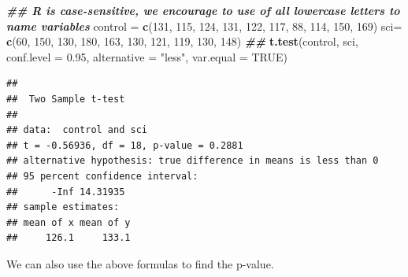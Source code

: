 \documentclass[
]{book}
\newenvironment{Shaded}{\begin{snugshade}}{\end{snugshade}}
\newcommand{\AttributeTok}[1]{\textcolor[rgb]{0.13,0.29,0.53}{#1}}
\newcommand{\ConstantTok}[1]{\textcolor[rgb]{0.56,0.35,0.01}{#1}}
\newcommand{\DecValTok}[1]{\textcolor[rgb]{0.00,0.00,0.81}{#1}}
\newcommand{\DocumentationTok}[1]{\textcolor[rgb]{0.56,0.35,0.01}{\textbf{\textit{#1}}}}
\newcommand{\FloatTok}[1]{\textcolor[rgb]{0.00,0.00,0.81}{#1}}
\newcommand{\FunctionTok}[1]{\textcolor[rgb]{0.13,0.29,0.53}{\textbf{#1}}}
\newcommand{\NormalTok}[1]{#1}
\newcommand{\OtherTok}[1]{\textcolor[rgb]{0.56,0.35,0.01}{#1}}
\newcommand{\StringTok}[1]{\textcolor[rgb]{0.31,0.60,0.02}{#1}}
\begin{document}
\begin{Shaded}
\begin{Highlighting}[]
\DocumentationTok{\#\# R is case{-}sensitive, we encourage to use of all lowercase letters to name variables}
\NormalTok{control }\OtherTok{=} \FunctionTok{c}\NormalTok{(}\DecValTok{131}\NormalTok{, }\DecValTok{115}\NormalTok{, }\DecValTok{124}\NormalTok{, }\DecValTok{131}\NormalTok{, }\DecValTok{122}\NormalTok{, }\DecValTok{117}\NormalTok{, }\DecValTok{88}\NormalTok{, }\DecValTok{114}\NormalTok{, }\DecValTok{150}\NormalTok{, }\DecValTok{169}\NormalTok{)}
\NormalTok{sci}\OtherTok{=} \FunctionTok{c}\NormalTok{(}\DecValTok{60}\NormalTok{, }\DecValTok{150}\NormalTok{, }\DecValTok{130}\NormalTok{, }\DecValTok{180}\NormalTok{, }\DecValTok{163}\NormalTok{, }\DecValTok{130}\NormalTok{, }\DecValTok{121}\NormalTok{, }\DecValTok{119}\NormalTok{, }\DecValTok{130}\NormalTok{, }\DecValTok{148}\NormalTok{)}
\DocumentationTok{\#\#}
\FunctionTok{t.test}\NormalTok{(control, sci, }
       \AttributeTok{conf.level =} \FloatTok{0.95}\NormalTok{, }
       \AttributeTok{alternative =} \StringTok{"less"}\NormalTok{, }
       \AttributeTok{var.equal =} \ConstantTok{TRUE}\NormalTok{)}
\end{Highlighting}
\end{Shaded}

\begin{verbatim}
## 
##  Two Sample t-test
## 
## data:  control and sci
## t = -0.56936, df = 18, p-value = 0.2881
## alternative hypothesis: true difference in means is less than 0
## 95 percent confidence interval:
##      -Inf 14.31935
## sample estimates:
## mean of x mean of y 
##     126.1     133.1
\end{verbatim}

We can also use the above formulas to find the p-value.
\end{document}
